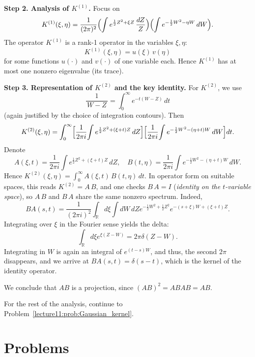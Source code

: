 \documentclass[letterpaper,11pt,oneside,reqno]{book}
\numberwithin{equation}{chapter}  %
\theoremstyle{definition}
\begin{document}
\medskip

\noindent\textbf{Step 2. Analysis of $K^{(1)}$.}
Focus on
\[
K^{(1)}(\xi,\eta)
=
\frac{1}{(2\pi)^2}
\Bigl(\int
e^{\frac12Z^2+\xi Z}\,\frac{dZ}{Z}\Bigr)
\Bigl(\int
e^{-\frac12W^2-\eta W}\,dW\Bigr).
\]
The operator $K^{(1)}$ is a rank-1 operator in the variables $\xi,\eta$:
\[
K^{(1)}(\xi,\eta)
=
u(\xi)\,v(\eta)
\]
for some functions $u(\cdot)$ and $v(\cdot)$ of one variable each.
Hence $K^{(1)}$ has at most one nonzero eigenvalue (its trace).

\medskip

\noindent\textbf{Step 3. Representation of $K^{(2)}$ and the key identity.}
For $K^{(2)}$, we use
\[
\frac{1}{\,W-Z\,}=\int_0^{\infty} e^{-t(W-Z)}\,dt
\]
(again justified by the choice of integration contours). Then
\[
K^{(2)}(\xi,\eta)
=
\int_0^\infty
\Bigl[
\frac{1}{2\pi i}\!\int
e^{\frac12Z^2+(\xi+t)Z}\,dZ
\Bigr]
\Bigl[
\frac{1}{2\pi i}\!\int
e^{-\frac12W^2-(\eta+t)W}\,dW
\Bigr]dt.
\]
Denote
\[
A(\xi,t)
=
\frac{1}{2\pi i}\int
e^{\frac12Z^2+(\xi+t)Z}\,dZ,
\quad
B(t,\eta)
=
\frac{1}{2\pi i}\int
e^{-\tfrac12W^2-(\eta+t)W}\,dW.
\]
Hence
\(
K^{(2)}(\xi,\eta)=\int_0^\infty A(\xi,t)\,B(t,\eta)\,dt.
\)
In operator form on suitable spaces,
this reads $K^{(2)}=A\,B$, and one checks $B\,A=I$
(\emph{identity on the $t$-variable space}),
so $A\,B$ and $B\,A$ share the same nonzero spectrum.
Indeed,
\begin{equation*}
	BA(s,t)=\frac{1}{(2\pi i)^2}
	\int_{\mathbb{R}}d\xi
	\int dW\, dZ
	e^{-\frac{1}{2}W^2+\frac{1}{2}Z^2}
	e^{-(s+\xi)W+(\xi+t)Z}.
\end{equation*}
Integrating over $\xi$ in the Fourier sense yields the delta:
\begin{equation*}
	\int_{\mathbb{R}}d\xi e^{\xi(Z-W)}=2\pi\delta(Z-W).
\end{equation*}
Integrating in $W$ is again an integral of $e^{(t-s)W}$, and thus, the second $2\pi$ disappears,
and we arrive at $BA(s,t)=\delta(s-t)$, which is the kernel of the identity operator.

We conclude that $AB$ is a projection, since
$(AB)^2=ABAB=AB$.

\medskip
For the rest of 
the analysis, continue to
Problem~\ref{lecture11:prob:Gaussian_kernel}.









\section{Problems}
\end{document}
